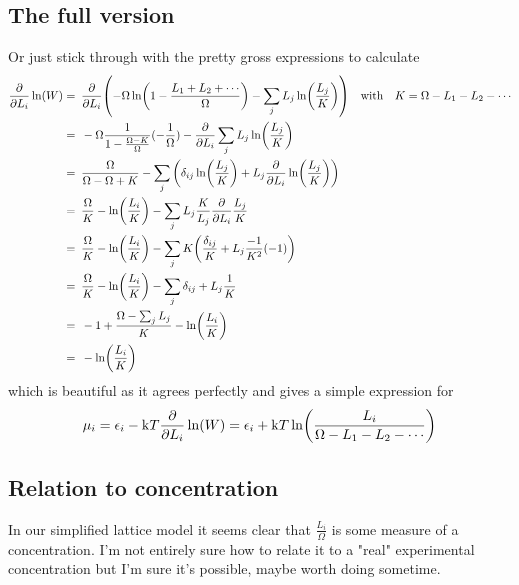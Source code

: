 \documentclass[11pt]{article}
\begin{document}
\subsection{The full version}
Or just stick through with the pretty gross expressions to calculate
\begin{align}
	\pdv{L_i}\ln(W) = & \enspace \pdv{L_i} \qty(-\Omega\ln(1-\frac{L_1+L_2+\cdots}{\Omega}) -\sum_j L_j\ln(\frac{L_j}{K})) \qq{with} K=\Omega-L_1-L_2-\cdots \\
	=                 & \enspace -\Omega\frac{1}{1-\frac{\Omega-K}{\Omega}}(-\frac{1}{\Omega}) - \pdv{L_i}\sum_jL_j\ln(\frac{L_j}{K})                        \\
	=                 & \enspace \frac{\Omega}{\Omega-\Omega+K} - \sum_j\qty(\delta_{ij}\ln(\frac{L_j}{K}) + L_j\pdv{L_i}\ln(\frac{L_j}{K}))                 \\
	=                 & \enspace \frac{\Omega}{K} -\ln(\frac{L_i}{K}) -\sum_j L_j\frac{K}{L_j}\pdv{L_i}\frac{L_j}{K}                                         \\
	=                 & \enspace \frac{\Omega}{K} -\ln(\frac{L_i}{K}) -\sum_j K\qty(\frac{\delta_{ij}}{K}+L_j\frac{-1}{K^2}(-1))                             \\
	=                 & \enspace \frac{\Omega}{K} -\ln(\frac{L_i}{K}) -\sum_j \delta_{ij} + L_j\frac{1}{K}                                                   \\
	=                 & \enspace -1 +\frac{\Omega-\sum_jL_j}{K} -\ln(\frac{L_i}{K})                                                                          \\
	=                 & \enspace -\ln(\frac{L_i}{K})                                                                                                         \\
\end{align}
which is beautiful as it agrees perfectly and gives a simple expression for
\begin{align}
	\mu_i = \epsilon_i - \si{k}T \pdv{L_i} \ln(W) = \epsilon_i + \si{k}T \ln(\frac{L_i}{\Omega-L_1-L_2-\cdots})
\end{align}

\subsection{Relation to concentration}
In our simplified lattice model it seems clear that $\frac{L_i}{\Omega}$ is some measure of a concentration.
I'm not entirely sure how to relate it to a "real" experimental concentration but I'm sure it's possible, maybe worth doing sometime.
\end{document}
